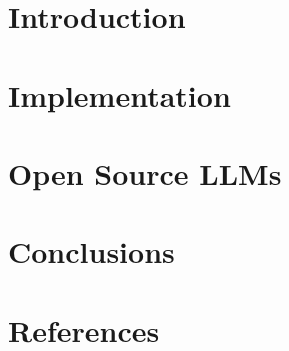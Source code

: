 \section[Intro]{Introduction}


\section[Impl]{Implementation}


\section[OS]{Open Source LLMs}



\section[End]{Conclusions}


\section[Refs]{References}
